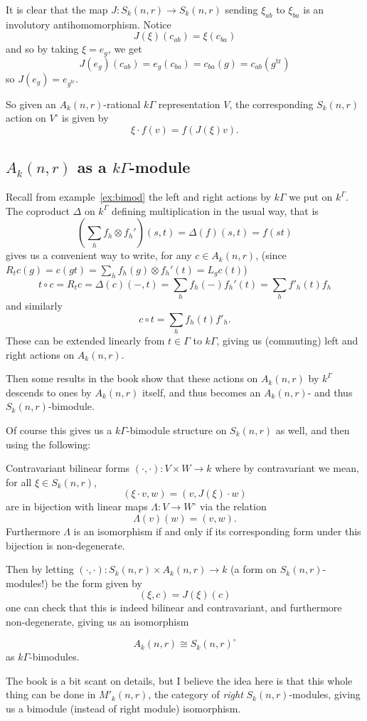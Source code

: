 \documentclass[12pt]{article}
\DeclareMathOperator{\1}{\mathbbm{1}}
\begin{document}
It is clear that the map $J:S_k(n,r)\to S_k(n,r)$ sending $\xi_{ab}$ to $\xi_{ba}$ is an involutory antihomomorphism.
Notice 
\[J(\xi)(c_{ab})=\xi(c_{ba})\]
and so by taking $\xi=e_g$, we get 
\[J(e_g)(c_{ab})=e_g(c_{ba})=c_{ba}(g)=c_{ab}(g^{\text{tr}})\]
so $J(e_g)=e_{g^{\text{tr}}}$.

So given an $A_k(n,r)$-rational $k\Gamma$ representation $V$, the corresponding $S_k(n,r)$ action on $V^\circ$ is given by 
\[\xi\cdot f (v)=f(J(\xi)v).\]

\subsection{\texorpdfstring{$A_k(n,r)$}{Ak(n,r)} as a \texorpdfstring{$k\Gamma$}{kGamma}-module}
Recall from example~\ref{ex:bimod} the left and right actions by $k\Gamma$ we put on $k^\Gamma$. The coproduct $\Delta$ on $k^\Gamma$
defining multiplication in the usual way, that is
\[\left(\sum_h f_h\otimes f_h'\right)(s,t)=\Delta(f)(s,t)=f(st)\]
gives us a convenient way to write, for any $c\in A_k(n,r)$, (since $R_tc(g)=c(gt)=\sum_h f_h(g)\otimes f_h'(t)=L_g c(t)$)
\[t\circ c= R_t c=\Delta(c)(-,t)=\sum_h f_h(-)f_h'(t)=\sum_h f'_h(t)f_h\]
and similarly
\[c\circ t=\sum_h f_h(t)f'_h.\]
These can be extended linearly from $t\in\Gamma$ to $k\Gamma$, giving us (commuting) left and right actions on $A_k(n,r)$.

Then some results in the book show that these actions on $A_k(n,r)$ by $k^\Gamma$ descends to ones by $A_k(n,r)$ itself, 
and thus becomes an $A_k(n,r)$- and thus $S_k(n,r)$-bimodule.

Of course this gives us a $k\Gamma$-bimodule structure on $S_k(n,r)$ as well, and then using the following:
\begin{thm}
	Contravariant bilinear forms $(\cdot,\cdot):V\times W\to k$ where by contravariant we mean, for all $\xi\in S_k(n,r)$,
	\[(\xi\cdot v,w)=(v,J(\xi)\cdot w)\]
	are in bijection with linear maps $\Lambda:V\to W^\circ$ via the relation 
	\[\Lambda(v)(w)=(v,w).\]
	Furthermore $\Lambda$ is an isomorphism if and only if its corresponding form under this bijection is non-degenerate.
\end{thm}
Then by letting $(\cdot,\cdot):S_k(n,r)\times A_k(n,r)\to k$ (a form on $S_k(n,r)$-modules!) be the form given by 
\[(\xi, c)=J(\xi)(c)\]
one can check that this is indeed bilinear and contravariant, and furthermore non-degenerate, giving us an isomorphism 
\begin{cor}
	\[A_k(n,r)\cong S_k(n,r)^\circ\]
	as $k\Gamma$-bimodules.
\end{cor}
\begin{rmk}
	The book is a bit scant on details, but I believe the idea here is that this whole thing can be done in $M'_k(n,r)$, the 
	category of \textit{right} $S_k(n,r)$-modules, giving us a bimodule (instead of right module) isomorphism.
\end{rmk}
\end{document}
